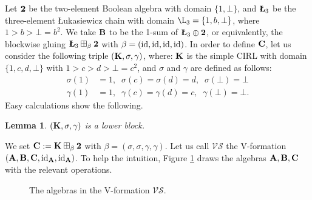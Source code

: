 \documentclass{amsart}
\newtheorem{lemma}[theorem]{Lemma}
\theoremstyle{definition}
\numberwithin{equation}{section}
\newcommand{\alg}[1]{{\textbf{\upshape #1}}}  %
\newcommand{\VS}{\mathcal{VS}}
\begin{document}
Let $\alg 2$ be the two-element Boolean algebra with domain $\{1, \bot\}$, and $\alg \L_3$ be the three-element \L ukasiewicz chain with domain $\L_3 = \{1, b, \bot\}$, where $1 > b > \bot = b^2$.
We take $\alg B$ to be the 1-sum of $\alg \L_3 \oplus \alg 2$, or equivalently, the blockwise gluing $\alg \L_3 \boxplus_\beta \alg 2$ with $\beta = ({\rm id}, {\rm id}, {\rm id}, {\rm id})$. 
In order to define $\alg C$, let us consider the following triple $(\alg K, \sigma, \gamma)$, where: $\alg K$ is the simple CIRL with domain $\{1, c, d, \bot \}$ with $1 > c > d > \bot = c^2$, and $\sigma$ and $\gamma$ are defined as follows:
\begin{align*}
	\sigma (1) &= 1, \;\;\sigma(c)=\sigma(d)=d, \;\; \sigma(\bot)=\bot\\
	\gamma (1) &= 1, \;\;\gamma(c) = \gamma(d)=c,\;\; \gamma(\bot)=\bot.
\end{align*}
Easy calculations show the following.
\begin{lemma}
	$(\alg K, \sigma, \gamma)$ is a lower block. 
\end{lemma}
We set $\alg C: = \alg K \boxplus_\beta \alg 2$ with $\beta = (\sigma,\sigma,\gamma, \gamma)$.
Let us call $\VS$ the V-formation $(\alg A, \alg B, \alg C, {\rm id}_{\alg A}, {\rm id}_{\alg A})$. To help the intuition, Figure \ref{figure:VSformation} draws the algebras $\alg A, \alg B, \alg C$ with the relevant operations.
\begin{figure}[h!]
\begin{center}
\caption{The algebras in the V-formation $\VS$.}\label{figure:VSformation}
   \end{center}  
\end{figure}
\end{document}
